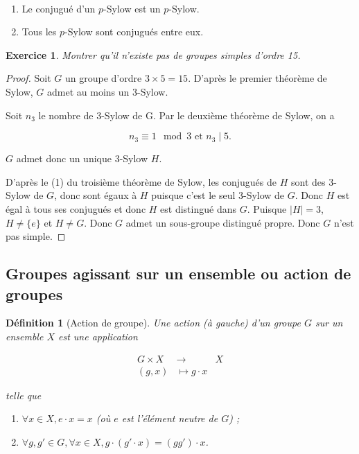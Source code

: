 \documentclass[french]{book}
\newtheorem{definition}{Définition}[section]
\newtheorem{exo}{Exercice}
\begin{document}
\begin{thm}

  \

  \begin{enumerate}
    \item Le conjugué d'un $p$-Sylow est un $p$-Sylow.
    \item Tous les $p$-Sylow sont conjugués entre eux.
  \end{enumerate}
\end{thm}

\begin{exo}
  Montrer qu'il n'existe pas de groupes simples d'ordre 15.
\end{exo}

\begin{proof}
  Soit $G$ un groupe d'ordre $3 \times 5 = 15$. D'après le premier théorème de Sylow, $G$ admet au moins un 3-Sylow.

  Soit $n_3$ le nombre de 3-Sylow de G. Par le deuxième théorème de Sylow, on a

  \[
  n_3 \equiv 1 \mod 3 \text{ et } n_3 \mid 5.
  \]

  $G$ admet donc un unique 3-Sylow $H$.

  D'après le (1) du troisième théorème de Sylow, les conjugués de $H$ sont des 3-Sylow de $G$, donc sont égaux à $H$ puisque c'est le seul 3-Sylow de $G$. Donc $H$ est égal à tous ses conjugués et donc $H$ est distingué dans $G$. Puisque $\lvert H \rvert = 3$, $H \neq \{ e \} $ et $H \neq G$. Donc $G$ admet un sous-groupe distingué propre. Donc $G$ n'est pas simple.
\end{proof}

\subsection{Groupes agissant sur un ensemble ou action de groupes}

\begin{definition}[Action de groupe]
  Une action (à gauche) d'un groupe $G$ sur un ensemble $X$ est une application

  \[
    \begin{array}{lll}
    G \times X & \longrightarrow & X \\
    (g,x) & \longmapsto g \cdot x
    \end{array}
  \]

  telle que

  \begin{enumerate}
    \item $\forall x \in X, e \cdot x = x$ (où $e$ est l'élément neutre de $G$) ;
    \item $\forall g, g' \in G, \forall x \in X, g \cdot (g' \cdot x) = (gg')\cdot x$.
  \end{enumerate}
\end{definition}
\end{document}
